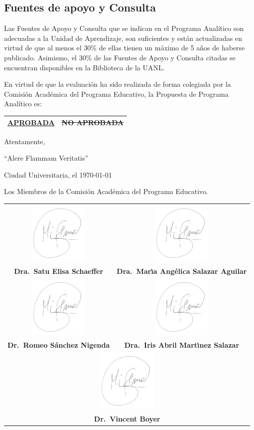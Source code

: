\documentclass{article}
\newcommand{\firma}{\vspace*{-10mm}\includegraphics[height=30mm]{firma.png}}
\newcommand{\angy}{Dra.\ Mar\'{\i}a Ang\'{e}lica Salazar Aguilar}
\newcommand{\vincent}{Dr.\ Vincent Boyer}
\newcommand{\iris}{Dra.\ Iris Abril Mart\'{\i}nez Salazar}
\newcommand{\elisa}{Dra.\ Satu Elisa Schaeffer}
\newcommand{\romeo}{Dr.\ Romeo S\'{a}nchez Nigenda}
\begin{document}
\begin{Form}
\section{Fuentes de apoyo y Consulta}

Las Fuentes de Apoyo y Consulta que se indican en el Programa Anal\'{i}tico son adecuadas a
la Unidad de Aprendizaje, son suficientes y est\'{a}n actualizadas en virtud de que al menos el
30\% de ellas tienen un m\'{a}ximo de 5 a\~{n}os de haberse publicado. Asimismo, el 30\% de las
Fuentes de Apoyo y Consulta citadas se encuentran disponibles en la Biblioteca de la
UANL. \begin{flushright}
  \quad
\end{flushright}



\end{Form}

\newpage

En virtud de que la evaluaci\'{o}n ha sido realizada de forma colegiada por la Comisi\'{o}n Acad\'{e}mica del
Programa Educativo, la Propuesta de Programa Anal\'{i}tico es:

\begin{center}
\begin{tabular}{|c|c|}
    \hline 
    \underline{\bf APROBADA} & \st{NO APROBADA} \\
    \hline
\end{tabular}

\quad

Atentamente,

``Alere Flammam Veritatis''

Ciudad Universitaria, el \today

\quad

Los Miembros de la Comisi\'{o}n Acad\'{e}mica del Programa Educativo.

\begin{tabular}{cc}
  \firma & \firma \\
         {\bf \elisa}
         & {\bf \angy } \\
         \firma & \firma \\
                {\bf \romeo} 
                & {\bf \iris } \\
                \multicolumn{2}{c}{\firma} \\
                \multicolumn{2}{c}{\bf \vincent} 
\end{tabular}
\end{center}
\end{document}
